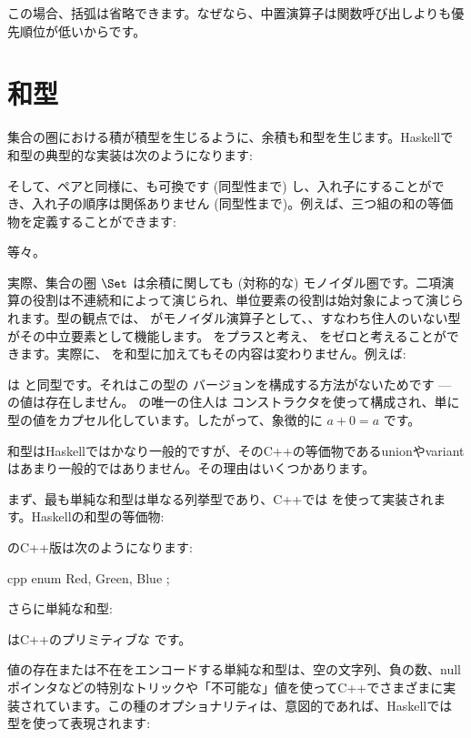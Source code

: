 この場合、括弧は省略できます。なぜなら、中置演算子は関数呼び出しよりも優先順位が低いからです。

\section{和型}

集合の圏における積が積型を生じるように、余積も和型を生じます。Haskellで和型の典型的な実装は次のようになります: 

そして、ペアと同様に、も可換です (同型性まで) し、入れ子にすることができ、入れ子の順序は関係ありません (同型性まで)。例えば、三つ組の和の等価物を定義することができます: 

等々。

実際、集合の圏 $\Set$ は余積に関しても (対称的な) モノイダル圏です。二項演算の役割は不連続和によって演じられ、単位要素の役割は始対象によって演じられます。型の観点では、 がモノイダル演算子として、、すなわち住人のいない型がその中立要素として機能します。 をプラスと考え、 をゼロと考えることができます。実際に、 を和型に加えてもその内容は変わりません。例えば: 

は  と同型です。それはこの型の  バージョンを構成する方法がないためです ---  の値は存在しません。  の唯一の住人は  コンストラクタを使って構成され、単に  型の値をカプセル化しています。したがって、象徴的に $a + 0 = a$ です。

和型はHaskellではかなり一般的ですが、そのC++の等価物であるunionやvariantはあまり一般的ではありません。その理由はいくつかあります。

まず、最も単純な和型は単なる列挙型であり、C++では  を使って実装されます。Haskellの和型の等価物: 

のC++版は次のようになります: 

\begin{snip}{cpp}
enum { Red, Green, Blue };
\end{snip}
さらに単純な和型: 

はC++のプリミティブな  です。

値の存在または不在をエンコードする単純な和型は、空の文字列、負の数、nullポインタなどの特別なトリックや「不可能な」値を使ってC++でさまざまに実装されています。この種のオプショナリティは、意図的であれば、Haskellでは  型を使って表現されます: 


